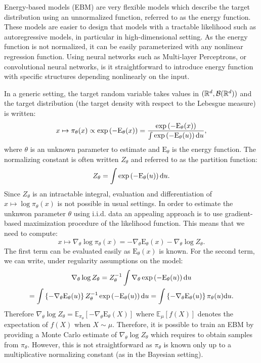 \documentclass[english,graybox,envcountchap,envcountsame,sectrefs,shortlabels]{svmono}
\theoremstyle{style}
\begin{document}
\begin{example}
Energy-based models (EBM) are very flexible models which describe the target distribution using an unnormalized function, referred to as the energy function. These models are easier to design that models with a tractable likelihood such as autoregressive models, in particular in high-dimensional setting. As the energy function is not normalized, it can
be easily parameterized with any nonlinear regression function. Using neural networks such as Multi-layer Perceptrons, or convolutional neural networks, is it straightforward to introduce energy function with specific structures depending nonlinearly on the input. %

In a generic setting, the target random variable takes values in $(\mathbb{R}^d,\mathcal{B}(\mathbb{R}^d))$ and the target distribution (the target density with respect to the Lebesgue measure) is written:
$$
x\mapsto \pi_\theta(x) \propto \exp\left(-\mathrm{E}_\theta(x)\right) = \frac{\exp\left(-\mathrm{E}_\theta(x)\right)}{\int \exp\left(-\mathrm{E}_\theta(u)\right)\mathrm{d} u},
$$
where $\theta$ is an unknown parameter to estimate and $\mathrm{E}_\theta$ is the energy function. The normalizing constant is often written $Z_\theta$ and referred to as the partition function:
$$
Z_\theta = \int \exp\left(-\mathrm{E}_\theta(u)\right)\mathrm{d} u.
$$
Since $Z_\theta$ is an intractable integral, evaluation and
differentiation of $x\mapsto \log \pi_\theta(x)$ is not possible in usual settings. In order to estimate the unknwon parameter $\theta$ using i.i.d. data an appealing approach is to use gradient-based maximization procedure of the likelihood function. This means that we need to compute:
$$
x\mapsto \nabla_\theta \log\pi_\theta(x) = -\nabla_\theta\mathrm{E}_\theta(x) - \nabla_\theta \log Z_\theta.
$$
The first term can be evaluated easily as $\mathrm{E}_\theta(x)$ is known. For the second term, we can write, under regularity assumptions on the model:
\begin{multline*}
\nabla_\theta \log Z_\theta = Z_\theta^{-1} \int \nabla_\theta\exp\left(-\mathrm{E}_\theta(u)\right)\mathrm{d} u \\=  \int \left\{-\nabla_\theta \mathrm{E}_\theta(u)\right\}Z_\theta^{-1}\exp\left(-\mathrm{E}_\theta(u)\right)\mathrm{d} u = \int \left\{-\nabla_\theta \mathrm{E}_\theta(u)\right\}\pi_\theta(u)\mathrm{d} u .
\end{multline*}
Therefore $\nabla_\theta \log Z_\theta = \mathbb{E}_{\pi_\theta}[-\nabla_\theta \mathrm{E}_\theta(X)]$ where $\mathbb{E}_{\mu}[f(X)]$ denotes the expectation of $f(X)$ when $X\sim \mu$. Therefore, it is possible to train an EBM by providing a Monte Carlo estimate of $\nabla_\theta \log Z_\theta$ which requires to obtain samples from $\pi_\theta$. However, this is not straightforward as $\pi_\theta$ is known only up to a multiplicative normalizing constant (as in the Bayesian setting).
\end{example}
\end{document}
